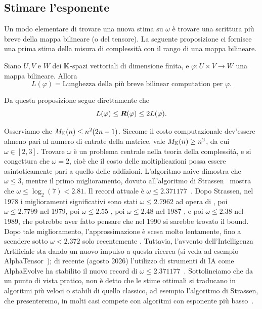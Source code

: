 \subsection*{Stimare l'esponente}

Un modo elementare di trovare una nuova stima su $ \omega $ è trovare una scrittura più breve della
mappa bilineare (o del tensore). La seguente proposizione ci fornisce una prima stima della misura
di complessità con il rango di una mappa bilineare.
\begin{proposition}

	Siano $ U,V $ e $ W $ dei $ \mathbb{K} $-spazi vettoriali di dimensione finita, e $ \varphi : U\times V \to  W $ una
	mappa bilineare. Allora
	\begin{equation*}
		L(\varphi) = \text{Lunghezza della più breve bilinear computation per } \varphi.
	\end{equation*}
\end{proposition}
\begin{remark}
	Da questa proposizione segue direttamente che
	\begin{equation}
		\label{eq:LandRank_estimate}
		L(\varphi) \le \bm{R}(\varphi) \le 2L(\varphi).
	\end{equation}
\end{remark}

Osserviamo che $ M_{\mathbb{K}}(n) \le n^2(2n - 1) $. Siccome il costo computazionale dev'essere almeno pari al numero di entrate della matrice, vale  $ M_{\mathbb{K}}(n) \ge n^2 $, da
cui $ \omega \in [2,3] $. Trovare $ \omega $ è un problema centrale
nella teoria della complessità, e si congettura che $ \omega = 2 $, cioè che il costo delle moltiplicazioni possa essere
asintoticamente pari a quello
delle addizioni.
L'algoritmo naive dimostra che $ \omega \le  3 $, mentre il primo miglioramento, dovuto all'algoritmo di Strassen~\cite{strassen69} mostra che $ \omega \le \log_2(7) < 2.81 $. Il record attuale è $ \omega \le 2.371177 $~\cite{alman2026}. Dopo Strassen,
nel 1978 i miglioramenti significativi sono stati $ \omega \le 2.7962 $ ad opera di
\cite{pan78}, poi $ \omega \le 2.7799 $ \cite{bini1980relations} nel 1979, poi $ \omega \le 2.55 $ \cite{sch81}, poi $
	\omega \le  2.48 $ nel 1987 \cite{str87}, e poi $ \omega \le 2.38 $ \cite{cw90} nel 1989, che potrebbe aver fatto
pensare che nel 1990 si sarebbe trovato il bound. Dopo tale miglioramento, l'approssimazione è scesa
molto lentamente, fino a scendere sotto $ \omega < 2.372 $ solo recentemente \cite{wil11,gall14,stothers2010complexity, alman2024}.
Tuttavia, l'avvento dell'Intelligenza Artificiale sta dando un nuovo impulso a questa ricerca (si veda ad esempio
AlphaTensor~\cite{fawzi2022discovering}); di recente (agosto 2026) l'utilizzo di strumenti di IA
come AlphaEvolve ha stabilito il nuovo record di $ \omega \le 2.371177 $~\cite{alman2026}.
Sottolineiamo che da un punto di vista pratico, non è detto che le stime ottimali si traducano in algoritmi più veloci
o stabili di quello classico, ad esempio l'algoritmo di Strassen, che presenteremo, in molti casi compete con algoritmi con esponente più basso~\cite{dalberto2023strassensmatrixmultiplicationalgorithm, DBLP:journals/corr/BensonB14}.

